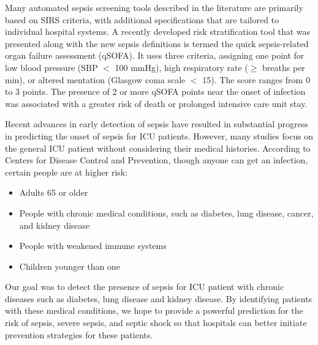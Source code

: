 \documentclass[twoside,11pt]{article}
\begin{document}
Many automated sepsis screening tools described in the literature are primarily based on SIRS criteria, with additional specifications that are tailored to individual hospital systems\cite{cite3}. A recently developed risk stratification tool that was presented along with the new sepsis definitions is termed the quick sepsis-related organ failure assessment (qSOFA). It uses three criteria, assigning one point for low blood pressure (SBP $<$ 100 mmHg), high respiratory rate ($\geq$ breaths per min), or altered mentation (Glasgow coma scale $<$ 15). The score ranges from 0 to 3 points. The presence of 2 or more qSOFA points near the onset of infection was associated with a greater risk of death or prolonged intensive care unit stay. 

Recent advances in early detection of sepsis have resulted in substantial progress in predicting the onset of sepsis for ICU patients. 
However, many studies focus on the general ICU patient without considering their medical histories. According to Centers for Disease Control and Prevention, though anyone can get an infection, certain people are at higher risk: 
\begin{itemize}
	\item Adults 65 or older
	\item People with chronic medical conditions, such as diabetes, lung disease, cancer, and kidney disease
	\item People with weakened immune systems
	\item Children younger than one
\end{itemize}

Our goal was to detect the presence of sepsis for ICU patient with chronic diseases such as diabetes, lung disease and kidney disease. By identifying patients with these medical conditions, we hope to provide a powerful prediction for the risk of sepsis, severe sepsis, and septic shock so that hospitals can better initiate prevention strategies for these patients.
\end{document}
